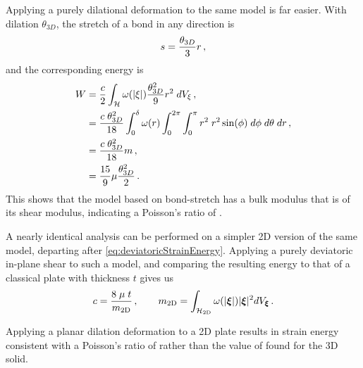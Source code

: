 %
Applying a purely dilational deformation to the same model is far easier.
With dilation $\theta_{3D}$, the stretch of a bond in any direction is
%
\begin{equation}
s = \frac{\theta_{3D}}{3} r\, ,\notag
\end{equation}
%
and the corresponding energy is 
%
\begin{align}
W &= \frac{c}{2}\int_\mathcal{H} \omega(|\xi|)\frac{\theta^2_{3D}}{9} r^2 \;dV_\xi\, ,\notag\\
&=\frac{c\;\theta^2_{3D}}{18} \int_0^\delta \omega(r)\int_0^{2\pi}\int_0^\pi r^2\;r^2 \sin(\phi)\;d\phi\;d\theta\;dr\, , \notag\\
&= \frac{c\;\theta^2_{3D}}{18} m\, , \notag\\
&= \frac{15}{9}\mu\frac{\theta^2_{3D}}{2}\, .
\end{align}
%
This shows that the model based on bond-stretch has a bulk modulus that is  of its shear modulus, indicating a Poisson's ratio of .

A nearly identical analysis can be performed on a simpler 2D version of the same model, departing after \cref{eq:deviatoricStrainEnergy}.
Applying a purely deviatoric in-plane shear to such a model, and comparing the resulting energy to that of a classical plate with thickness $t$ gives us
%
\begin{equation}
    c = \frac{8\;\mu\;t}{m_\textrm{2D}}\,,\qquad m_\textrm{2D} =\int_\mathcal{H_\textrm{2D}}\omega(|\boldsymbol{\xi}|)|\boldsymbol{\xi}|^2 dV_{\boldsymbol{\xi}}\, .  \notag
\end{equation}
%

Applying a planar dilation deformation to a 2D plate results in strain energy consistent with a Poisson's ratio of  rather than the value of  found for the 3D solid.

